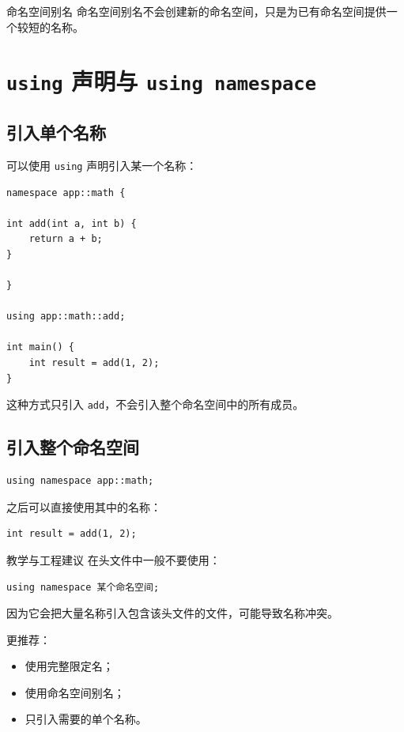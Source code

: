 \documentclass[UTF8,12pt,a4paper]{ctexart}
\begin{document}
\begin{conceptbox}{命名空间别名}
命名空间别名不会创建新的命名空间，只是为已有命名空间提供一个较短的名称。
\end{conceptbox}

\section{\texttt{using} 声明与 \texttt{using namespace}}

\subsection{引入单个名称}

可以使用 \texttt{using} 声明引入某一个名称：

\begin{lstlisting}
namespace app::math {

int add(int a, int b) {
    return a + b;
}

}

using app::math::add;

int main() {
    int result = add(1, 2);
}
\end{lstlisting}

这种方式只引入 \texttt{add}，不会引入整个命名空间中的所有成员。

\subsection{引入整个命名空间}

\begin{lstlisting}
using namespace app::math;
\end{lstlisting}

之后可以直接使用其中的名称：

\begin{lstlisting}
int result = add(1, 2);
\end{lstlisting}

\begin{warningbox}{教学与工程建议}
在头文件中一般不要使用：

\begin{lstlisting}
using namespace 某个命名空间;
\end{lstlisting}

因为它会把大量名称引入包含该头文件的文件，可能导致名称冲突。

更推荐：

\begin{itemize}
    \item 使用完整限定名；
    \item 使用命名空间别名；
    \item 只引入需要的单个名称。
\end{itemize}
\end{warningbox}
\end{document}
